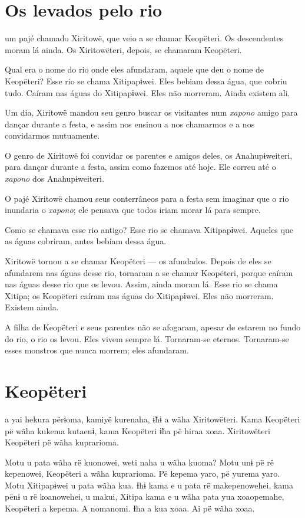 \chapter{Os levados pelo rio}

 um pajé chamado Xiritowë, que veio a se chamar Keopëteri. Os
descendentes moram lá ainda. Os Xiritowëteri, depois, se chamaram
Keopëteri. 

Qual era o nome do rio onde eles afundaram, aquele que deu o nome de
Keopëteri? Esse rio se chama Xitipapɨwei. Eles bebiam dessa água, que
cobriu tudo. Caíram nas águas do Xitipapɨwei. Eles não morreram. Ainda
existem ali. 

Um dia, Xiritowë mandou seu genro buscar os visitantes
num \textit{xapono} amigo para dançar durante a festa, e assim
nos ensinou a nos chamarmos e a nos convidarmos mutuamente. 

O genro de Xiritowë foi convidar os parentes e amigos deles, os
Anahupɨweiteri, para dançar durante a festa, assim como fazemos até hoje.
Ele correu até o \textit{xapono} dos Anahupɨweiteri. 

O pajé Xiritowë chamou seus conterrâneos para a festa sem imaginar que o
 rio inundaria o \textit{xapono}; ele pensava que todos iriam morar lá para
 sempre. 

Como se chamava esse rio antigo? Esse rio se chamava
 Xitipapɨwei. Aqueles que as águas cobriram, antes bebiam dessa água.

Xiritowë tornou a se chamar Keopëteri --- os afundados. Depois de eles se
 afundarem nas águas desse rio, tornaram a se chamar Keopëteri, porque
 caíram nas águas desse rio que os levou. Assim, ainda moram lá. Esse rio
 se chama Xitipa; os Keopëteri caíram nas águas do Xitipapɨwei. Eles não
 morreram. Existem ainda.

A filha de Keopëteri e seus parentes não se afogaram, apesar de estarem
no fundo do rio, o rio os levou. Eles vivem sempre lá. Tornaram-se
eternos. Tornaram-se esses monstros que nunca morrem; eles afundaram.

\chapter{Keopëteri}

 a yai hekura përɨoma, kamiyë kurenaha, ɨ̃hɨ a wãha
Xiritowëteri. Kama Keopëteri pë wãha kukema kutaenɨ, kama Keopëteri ɨ̃ha
pë hiraa xoaa. Xiritowëteri Keopëteri pë wãha kuprarioma.

Motu u pata wãha rë kuonowei, weti naha u wãha kuoma? Motu unɨ pë rë
kepenowei, Keopëteri a wãha kuprarioma. Pë kepema yaro, pë yurema yaro.
Motu Xitipapɨwei u pata wãha kua. Ɨhɨ kama e u pata rë makepenowehei,
kama pënɨ u rë koanowehei, u makui, Xitipa kama e u wãha pata yua
xoaopemahe, Keopëteri a kepema. A nomanomi. Ɨha a kua xoaa. Ai pë wãha
xoaa. 

